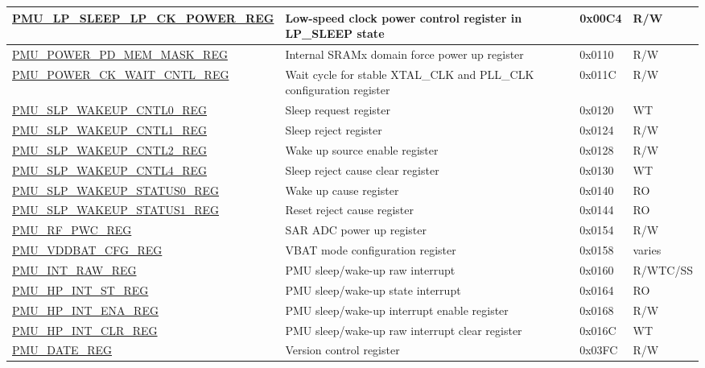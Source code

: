 \begin{longtable}{ | l | L{6cm} | L{1.3cm} | L{1.5cm} | }
\hyperref[regdesc:PMULPSLEEPLPCKPOWERREG]{PMU\_LP\_SLEEP\_LP\_CK\_POWER\_REG} & Low-speed clock power control register in LP\_SLEEP state & 0x00C4 & R/W \\ \hline
\hyperref[regdesc:PMUPOWERPDMEMMASKREG]{PMU\_POWER\_PD\_MEM\_MASK\_REG} & Internal SRAMx domain force power up register & 0x0110 & R/W \\ \hline
\hyperref[regdesc:PMUPOWERCKWAITCNTLREG]{PMU\_POWER\_CK\_WAIT\_CNTL\_REG} & Wait cycle for stable XTAL\_CLK and PLL\_CLK configuration register & 0x011C & R/W \\ \hline
\hyperref[regdesc:PMUSLPWAKEUPCNTL0REG]{PMU\_SLP\_WAKEUP\_CNTL0\_REG} & Sleep request register & 0x0120 & WT \\ \hline
\hyperref[regdesc:PMUSLPWAKEUPCNTL1REG]{PMU\_SLP\_WAKEUP\_CNTL1\_REG} & Sleep reject register & 0x0124 & R/W \\ \hline
\hyperref[regdesc:PMUSLPWAKEUPCNTL2REG]{PMU\_SLP\_WAKEUP\_CNTL2\_REG} & Wake up source enable register & 0x0128 & R/W \\ \hline
\hyperref[regdesc:PMUSLPWAKEUPCNTL4REG]{PMU\_SLP\_WAKEUP\_CNTL4\_REG} & Sleep reject cause clear register & 0x0130 & WT \\ \hline
\hyperref[regdesc:PMUSLPWAKEUPSTATUS0REG]{PMU\_SLP\_WAKEUP\_STATUS0\_REG} & Wake up cause register & 0x0140 & RO \\ \hline
\hyperref[regdesc:PMUSLPWAKEUPSTATUS1REG]{PMU\_SLP\_WAKEUP\_STATUS1\_REG} & Reset reject cause register & 0x0144 & RO \\ \hline
\hyperref[regdesc:PMURFPWCREG]{PMU\_RF\_PWC\_REG} & SAR ADC power up register & 0x0154 & R/W \\ \hline
\hyperref[regdesc:PMUVDDBATCFGREG]{PMU\_VDDBAT\_CFG\_REG} & VBAT mode configuration register & 0x0158 & varies \\ \hline
\hyperref[regdesc:PMUINTRAWREG]{PMU\_INT\_RAW\_REG} & PMU sleep/wake-up raw interrupt & 0x0160 & R/WTC/SS \\ \hline
\hyperref[regdesc:PMUHPINTSTREG]{PMU\_HP\_INT\_ST\_REG} & PMU sleep/wake-up state interrupt & 0x0164 & RO \\ \hline
\hyperref[regdesc:PMUHPINTENAREG]{PMU\_HP\_INT\_ENA\_REG} & PMU sleep/wake-up interrupt enable register & 0x0168 & R/W \\ \hline
\hyperref[regdesc:PMUHPINTCLRREG]{PMU\_HP\_INT\_CLR\_REG} & PMU sleep/wake-up raw interrupt clear register & 0x016C & WT \\ \hline

\hyperref[regdesc:PMUDATEREG]{PMU\_DATE\_REG} & Version control register & 0x03FC & R/W \\ \hline
\end{longtable}
